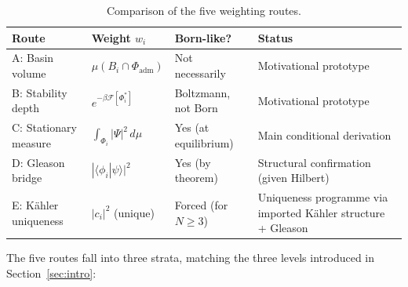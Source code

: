 \documentclass[12pt]{article}
\newcommand{\Fcal}{\mathcal{F}}
\begin{document}
\begin{table}[ht]
\centering
\caption{Comparison of the five weighting routes.}
\label{tab:routes}
\begin{tabular}{@{}llll@{}}
\toprule
Route & Weight $w_i$ & Born-like? & Status \\
\midrule
A: Basin volume & $\mu(B_i \cap \Phi_{\mathrm{adm}})$ & Not necessarily & Motivational prototype \\
B: Stability depth & $e^{-\beta \Fcal[\Phi_i^*]}$ & Boltzmann, not Born & Motivational prototype \\
C: Stationary measure & $\int_{\Phi_i} |\Psi|^2\, d\mu$ & Yes (at equilibrium) & Main conditional derivation \\
D: Gleason bridge & $|\langle \phi_i | \psi \rangle|^2$ & Yes (by theorem) & Structural confirmation (given Hilbert) \\
E: K\"ahler uniqueness & $|c_i|^2$ (unique) & Forced (for $N{\geq}3$) & Uniqueness programme via imported K\"ahler structure + Gleason \\
\bottomrule
\end{tabular}
\end{table}

The five routes fall into three strata, matching the three levels introduced in Section~\ref{sec:intro}:
\end{document}
